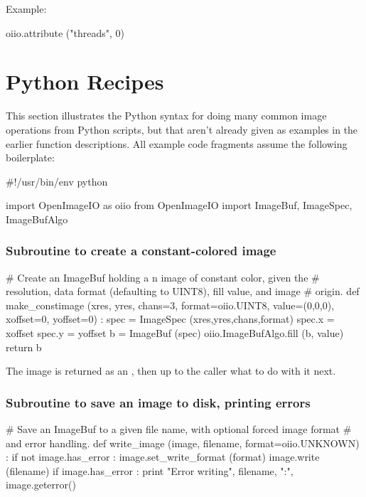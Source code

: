 \noindent Example:
\begin{code}
    oiio.attribute ("threads", 0)
\end{code}
\apiend


\section{Python Recipes}
\label{sec:pythonrecipes}

This section illustrates the Python syntax for doing many common image
operations from Python scripts, but that aren't already given as examples
in the earlier function descriptions.  All example code fragments assume the
following boilerplate:

\begin{code}
    #!/usr/bin/env python 
    
    import OpenImageIO as oiio
    from OpenImageIO import ImageBuf, ImageSpec, ImageBufAlgo
\end{code}


\subsubsection*{Subroutine to create a constant-colored image}
\begin{code}
    # Create an ImageBuf holding a n image of constant color, given the
    # resolution, data format (defaulting to UINT8), fill value, and image
    # origin.
    def make_constimage (xres, yres, chans=3, format=oiio.UINT8, value=(0,0,0),
                         xoffset=0, yoffset=0) :
        spec = ImageSpec (xres,yres,chans,format)
        spec.x = xoffset
        spec.y = yoffset
        b = ImageBuf (spec)
        oiio.ImageBufAlgo.fill (b, value)
        return b
\end{code}

\noindent The image is returned as an \ImageBuf, then up to the caller 
what to do with it next.

\subsubsection*{Subroutine to save an image to disk, printing errors}
\begin{code}
    # Save an ImageBuf to a given file name, with optional forced image format
    # and error handling.
    def write_image (image, filename, format=oiio.UNKNOWN) :
        if not image.has_error :
            image.set_write_format (format)
            image.write (filename)
        if image.has_error :
            print "Error writing", filename, ":", image.geterror()
\end{code}


